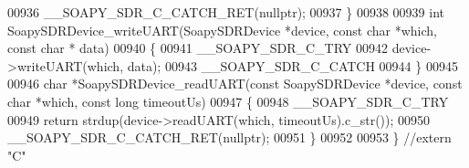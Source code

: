 \begin{DoxyCode}
00936     __SOAPY_SDR_C_CATCH_RET(\textcolor{keyword}{nullptr});
00937 \}
00938 
00939 \textcolor{keywordtype}{int} SoapySDRDevice_writeUART(SoapySDRDevice *device, \textcolor{keyword}{const} \textcolor{keywordtype}{char} *which, \textcolor{keyword}{const} \textcolor{keywordtype}{char} *
      data)
00940 \{
00941     __SOAPY_SDR_C_TRY
00942     device->writeUART(which, data);
00943     __SOAPY_SDR_C_CATCH
00944 \}
00945 
00946 \textcolor{keywordtype}{char} *SoapySDRDevice_readUART(\textcolor{keyword}{const} SoapySDRDevice *device, \textcolor{keyword}{const} \textcolor{keywordtype}{char} *which, \textcolor{keyword}{const} \textcolor{keywordtype}{long} timeoutUs)
00947 \{
00948     __SOAPY_SDR_C_TRY
00949     \textcolor{keywordflow}{return} strdup(device->readUART(which, timeoutUs).c\_str());
00950     __SOAPY_SDR_C_CATCH_RET(\textcolor{keyword}{nullptr});
00951 \}
00952 
00953 \} \textcolor{comment}{//extern "C"}
\end{DoxyCode}
